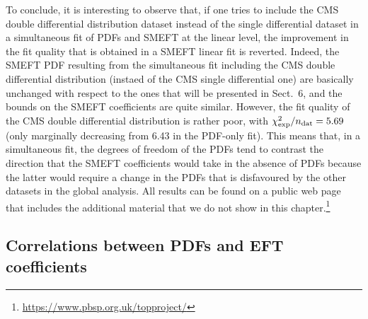 \documentclass[withindex,glossary]{cam-thesis}
\begin{document}
 To conclude, it is interesting to observe that, if one
  tries to include the CMS double differential distribution dataset
  instead of the single differential dataset in a simultaneous fit of
  PDFs and SMEFT at the linear level, the improvement in the fit quality that is obtained
  in a SMEFT linear fit is reverted. Indeed, the SMEFT PDF resulting
  from the simultaneous fit including the CMS double differential
distribution (instaed of the CMS single differential one) are
basically unchanged with respect to the ones that will be presented in
Sect.~6, and the bounds on the SMEFT coefficients are quite similar. However, 
the fit quality of the CMS double differential distribution is rather poor,
with $\chi^2_{\rm exp}/n_{\rm dat}=5.69$ (only marginally decreasing from 6.43 in the
PDF-only fit). 
This means that, in a simultaneous fit, the degrees of freedom of the PDFs
tend to contrast the direction that the SMEFT coefficients would take
in the absence of PDFs because the latter would require a change in
the PDFs that is disfavoured by the other datasets in the global
analysis. All results can be found on a public web page that
includes the additional material that we do not show in this chapter.\footnote{\url{https://www.pbsp.org.uk/topproject/}}




\subsection{Correlations between PDFs and EFT coefficients}
\label{subsec:pdfeftcorr}
\end{document}
